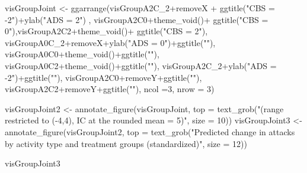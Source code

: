 \documentclass[
  10pt,
  dvipsnames,enabledeprecatedfontcommands]{scrartcl}
\newenvironment{Shaded}{\begin{snugshade}}{\end{snugshade}}
\newcommand{\AttributeTok}[1]{\textcolor[rgb]{0.77,0.63,0.00}{#1}}
\newcommand{\DecValTok}[1]{\textcolor[rgb]{0.00,0.00,0.81}{#1}}
\newcommand{\FunctionTok}[1]{\textcolor[rgb]{0.00,0.00,0.00}{#1}}
\newcommand{\NormalTok}[1]{#1}
\newcommand{\OtherTok}[1]{\textcolor[rgb]{0.56,0.35,0.01}{#1}}
\newcommand{\SpecialCharTok}[1]{\textcolor[rgb]{0.00,0.00,0.00}{#1}}
\newcommand{\StringTok}[1]{\textcolor[rgb]{0.31,0.60,0.02}{#1}}
\begin{document}
\begin{Shaded}
\begin{Highlighting}[]
\NormalTok{visGroupJoint }\OtherTok{\textless{}{-}} \FunctionTok{ggarrange}\NormalTok{(visGroupA2C\_2}\SpecialCharTok{+}\NormalTok{removeX }\SpecialCharTok{+} \FunctionTok{ggtitle}\NormalTok{(}\StringTok{"CBS = {-}2"}\NormalTok{)}\SpecialCharTok{+}\FunctionTok{ylab}\NormalTok{(}\StringTok{"ADS = 2"}\NormalTok{) , visGroupA2C0}\SpecialCharTok{+}\FunctionTok{theme\_void}\NormalTok{()}\SpecialCharTok{+} \FunctionTok{ggtitle}\NormalTok{(}\StringTok{"CBS = 0"}\NormalTok{),visGroupA2C2}\SpecialCharTok{+}\FunctionTok{theme\_void}\NormalTok{()}\SpecialCharTok{+} \FunctionTok{ggtitle}\NormalTok{(}\StringTok{"CBS = 2"}\NormalTok{), }
\NormalTok{          visGroupA0C\_2}\SpecialCharTok{+}\NormalTok{removeX}\SpecialCharTok{+}\FunctionTok{ylab}\NormalTok{(}\StringTok{"ADS = 0"}\NormalTok{)}\SpecialCharTok{+}\FunctionTok{ggtitle}\NormalTok{(}\StringTok{""}\NormalTok{), visGroupA0C0}\SpecialCharTok{+}\FunctionTok{theme\_void}\NormalTok{()}\SpecialCharTok{+}\FunctionTok{ggtitle}\NormalTok{(}\StringTok{""}\NormalTok{), visGroupA0C2}\SpecialCharTok{+}\FunctionTok{theme\_void}\NormalTok{()}\SpecialCharTok{+}\FunctionTok{ggtitle}\NormalTok{(}\StringTok{""}\NormalTok{),}
\NormalTok{          visGroupA2C\_2}\SpecialCharTok{+}\FunctionTok{ylab}\NormalTok{(}\StringTok{"ADS = {-}2"}\NormalTok{)}\SpecialCharTok{+}\FunctionTok{ggtitle}\NormalTok{(}\StringTok{""}\NormalTok{), visGroupA2C0}\SpecialCharTok{+}\NormalTok{removeY}\SpecialCharTok{+}\FunctionTok{ggtitle}\NormalTok{(}\StringTok{""}\NormalTok{), visGroupA2C2}\SpecialCharTok{+}\NormalTok{removeY}\SpecialCharTok{+}\FunctionTok{ggtitle}\NormalTok{(}\StringTok{""}\NormalTok{), }\AttributeTok{ncol =}\DecValTok{3}\NormalTok{, }\AttributeTok{nrow =} \DecValTok{3}\NormalTok{)}

 
\NormalTok{visGroupJoint2 }\OtherTok{\textless{}{-}} \FunctionTok{annotate\_figure}\NormalTok{(visGroupJoint, }
  \AttributeTok{top =} \FunctionTok{text\_grob}\NormalTok{(}\StringTok{"(range restricted to ({-}4,4), IC at the rounded mean = 5)"}\NormalTok{,}
                  \AttributeTok{size =} \DecValTok{10}\NormalTok{))}
\NormalTok{visGroupJoint3 }\OtherTok{\textless{}{-}} \FunctionTok{annotate\_figure}\NormalTok{(visGroupJoint2, }
  \AttributeTok{top =} \FunctionTok{text\_grob}\NormalTok{(}\StringTok{"Predicted change in attacks by activity type and treatment groups (standardized)"}\NormalTok{,}
                  \AttributeTok{size =} \DecValTok{12}\NormalTok{))}

\NormalTok{visGroupJoint3 }
\end{Highlighting}
\end{Shaded}
\end{document}
